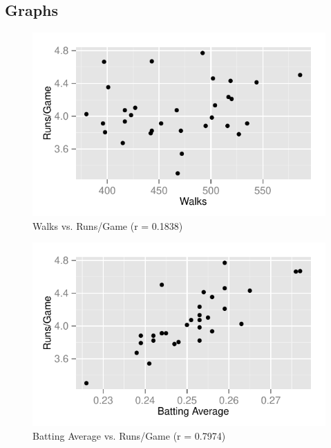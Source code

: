 \documentclass[landscape]{article}
\begin{document}
  \subsection{Graphs} %
  
  \begin{figure}[H]
    \centering
    \includegraphics[scale = 0.9]{figures/mlb/bb_vs_rg.pdf}
    \caption{Walks vs. Runs/Game (r = 0.1838)}
  \end{figure}

  \begin{figure}[H]
    \centering
    \includegraphics[scale = 0.9]{figures/mlb/ba_vs_rg.pdf}
    \caption{Batting Average vs. Runs/Game (r = 0.7974)}
  \end{figure}
\end{document}

